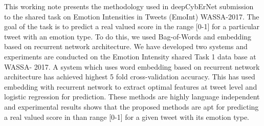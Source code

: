 This working note presents the methodology used in deepCybErNet submission to the shared task on Emotion Intensities in Tweets (EmoInt) WASSA-2017. The goal of the task is to predict a real valued score in the range [0-1] for a particular tweet with an emotion type. To do this, we used Bag-of-Words and embedding based on recurrent network architecture. We have developed two systems and experiments are conducted on the Emotion Intensity shared Task 1 data base at WASSA- 2017. A system which uses word embedding based on recurrent network architecture has achieved highest 5 fold cross-validation accuracy. This has used embedding with recurrent network to extract optimal features at tweet level and logistic regression for prediction. These methods are highly language independent and experimental results shows that the proposed methods are apt for predicting a real valued score in than range [0-1] for a given tweet with its emotion type.
